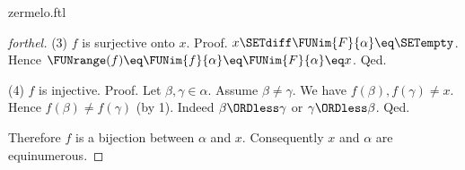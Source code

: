 \documentclass{naproche-library}
\begin{document}
\begin{smodule}[title=Zermelo's Well-Ordering Theorem]{zermelo.ftl}
\begin{proof}[forthel]
  (3) $f$ is surjective onto $x$. \newline
  Proof.
    $x \SETdiff \FUNim{F}{\alpha} \eq \SETempty$.
    Hence $\FUNrange(f)
      \eq \FUNim{f}{\alpha}
      \eq \FUNim{F}{\alpha}
      \eq x$.
  Qed.

  (4) $f$ is injective. \newline
  Proof.
    Let $\beta, \gamma \in \alpha$.
    Assume $\beta \neq \gamma$.
    We have $f(\beta), f(\gamma) \neq x$.
    Hence $f(\beta) \neq f(\gamma)$ (by 1).
    Indeed $\beta \ORDless \gamma$ or $\gamma \ORDless \beta$.
  Qed.

  Therefore $f$ is a bijection between $\alpha$ and $x$.
  Consequently $x$ and $\alpha$ are equinumerous.
\end{proof}
\end{smodule}
\end{document}
